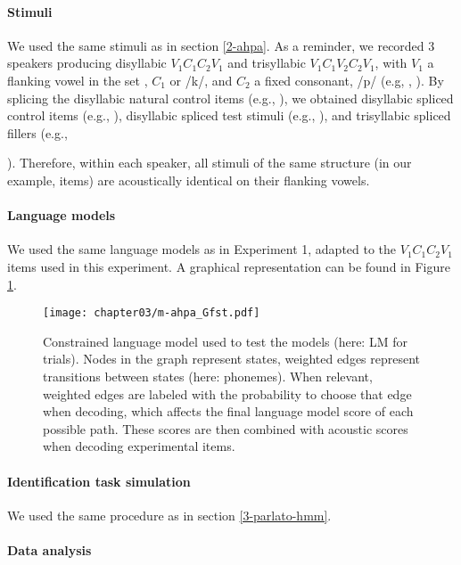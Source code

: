 \paragraph{Stimuli}
We used the same stimuli as in section \ref{2-ahpa}. As a reminder, we recorded 3 speakers producing disyllabic $V_{1}C_{1}C_{2}V_{1}$ and trisyllabic $V_{1}C_{1}V_{2}C_{2}V_{1}$, with $V_{1}$ a flanking vowel in the set , $C_{1}$  or /k/, and $C_{2}$ a fixed consonant, /p/ (e.g, , ). By splicing the disyllabic natural control items (e.g., ), we obtained disyllabic spliced control items (e.g., \texorpdfstring{}{}), disyllabic spliced test stimuli (e.g., \texorpdfstring{}{}), and trisyllabic spliced fillers (e.g., {). Therefore, within each speaker, all stimuli of the same structure (in our example,  items) are acoustically identical on their flanking vowels.
  
\paragraph{Language models}
We used the same language models as in Experiment 1, adapted to the $V_{1}C_{1}C_{2}V_{1}$ items used in this experiment. A graphical representation can be found in Figure \ref{fig:m-ahpa_G}.
  
\begin{figure}[htb]
    \centering
    \texttt{[image: chapter03/m-ahpa\_Gfst.pdf]}
    \caption{Constrained language model used to test the models (here: LM for  trials). Nodes in the graph represent states, weighted edges represent transitions between states (here: phonemes). When relevant, weighted edges are labeled with the probability to choose that edge when decoding, which affects the final language model score of each possible path. These scores are then combined with acoustic scores when decoding experimental items.}
    \label{fig:m-ahpa_G}
\end{figure}
  
\paragraph{Identification task simulation}
We used the same procedure as in section \ref{3-parlato-hmm}.

\paragraph{{\color{red}Data analysis}}

}
